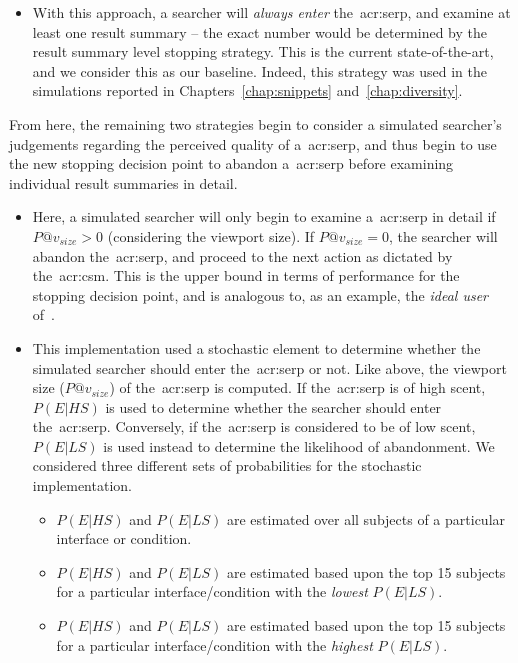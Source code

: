 \begin{itemize}
    \item{ With this approach, a searcher will \emph{always enter} the~\gls{acr:serp}, and examine at least one result summary -- the exact number would be determined by the result summary level stopping strategy. This is the current state-of-the-art, and we consider this as our baseline. Indeed, this strategy was used in the simulations reported in Chapters~\ref{chap:snippets} and~\ref{chap:diversity}.}
\end{itemize}

From here, the remaining two strategies begin to consider a simulated searcher's judgements regarding the perceived quality of a~\gls{acr:serp}, and thus begin to use the new stopping decision point to abandon a~\gls{acr:serp} before examining individual result summaries in detail.

\begin{itemize}
    \item{ Here, a simulated searcher will only begin to examine a~\gls{acr:serp} in detail if $P@v_{size} > 0$ (considering the viewport size). If $P@v_{size} = 0$, the searcher will abandon the~\gls{acr:serp}, and proceed to the next action as dictated by the~\gls{acr:csm}. This is the upper bound in terms of performance for the stopping decision point, and is analogous to, as an example, the \emph{ideal user} of~\cite{hagen2016simulating_users}.}
    \item{ This implementation used a stochastic element to determine whether the simulated searcher should enter the~\gls{acr:serp} or not. Like above, the viewport size ($P@v_{size}$) of the~\gls{acr:serp} is computed. If the~\gls{acr:serp} is of high scent, $P(E|HS)$ is used to determine whether the searcher should enter the~\gls{acr:serp}. Conversely, if the~\gls{acr:serp} is considered to be of low scent, $P(E|LS)$ is used instead to determine the likelihood of abandonment. We considered three different sets of probabilities for the stochastic implementation.}
    
    \begin{itemize}
        \item{ $P(E|HS)$ and $P(E|LS)$ are estimated over all subjects of a particular interface or condition.}
        \item{ $P(E|HS)$ and $P(E|LS)$ are estimated based upon the top 15 subjects for a particular interface/condition with the \emph{lowest} $P(E|LS)$.}
        \item{ $P(E|HS)$ and $P(E|LS)$ are estimated based upon the top 15 subjects for a particular interface/condition with the \emph{highest} $P(E|LS)$.}
    \end{itemize}
\end{itemize}

